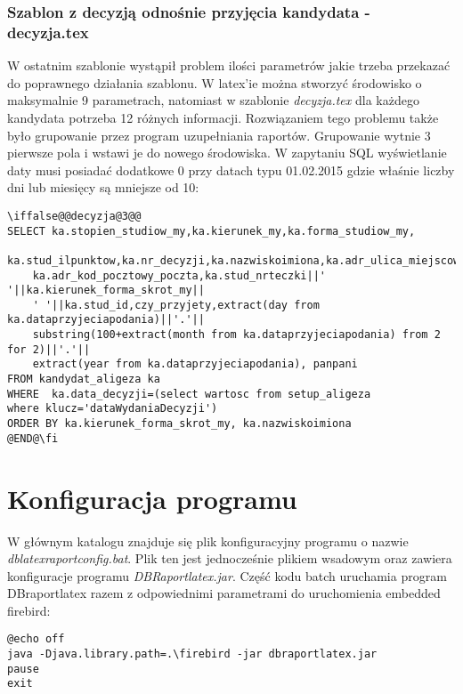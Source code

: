 \subsubsection*{Szablon z decyzją odnośnie przyjęcia kandydata - decyzja.tex}
W ostatnim szablonie wystąpił problem ilości parametrów jakie trzeba przekazać do poprawnego działania szablonu. W latex'ie można stworzyć środowisko o maksymalnie 9 parametrach, natomiast w szablonie \emph{decyzja.tex} dla każdego kandydata potrzeba 12 różnych informacji. Rozwiązaniem tego problemu także było grupowanie przez program uzupełniania raportów. Grupowanie wytnie 3 pierwsze pola i wstawi je do nowego środowiska. W zapytaniu SQL wyświetlanie daty musi posiadać dodatkowe 0 przy datach typu 01.02.2015 gdzie właśnie liczby dni lub miesięcy są mniejsze od 10:
 \begin{lstlisting}
\iffalse@@decyzja@3@@
SELECT ka.stopien_studiow_my,ka.kierunek_my,ka.forma_studiow_my,
	ka.stud_ilpunktow,ka.nr_decyzji,ka.nazwiskoimiona,ka.adr_ulica_miejscowosc_nr_domu,
	ka.adr_kod_pocztowy_poczta,ka.stud_nrteczki||' '||ka.kierunek_forma_skrot_my||
	' '||ka.stud_id,czy_przyjety,extract(day from ka.dataprzyjeciapodania)||'.'||
	substring(100+extract(month from ka.dataprzyjeciapodania) from 2 for 2)||'.'||
	extract(year from ka.dataprzyjeciapodania), panpani
FROM kandydat_aligeza ka 
WHERE  ka.data_decyzji=(select wartosc from setup_aligeza 
where klucz='dataWydaniaDecyzji')
ORDER BY ka.kierunek_forma_skrot_my, ka.nazwiskoimiona
@END@\fi
\end{lstlisting}

\section{Konfiguracja programu}

W głównym katalogu znajduje się plik konfiguracyjny programu o nazwie  \emph{dblatexraportconfig.bat}. Plik ten jest jednocześnie plikiem wsadowym oraz zawiera konfiguracje programu \emph{DBRaportlatex.jar}. Część kodu batch uruchamia program DBraportlatex razem z odpowiednimi parametrami do uruchomienia embedded firebird:
 \begin{lstlisting}
@echo off
java -Djava.library.path=.\firebird -jar dbraportlatex.jar
pause
exit
\end{lstlisting}

